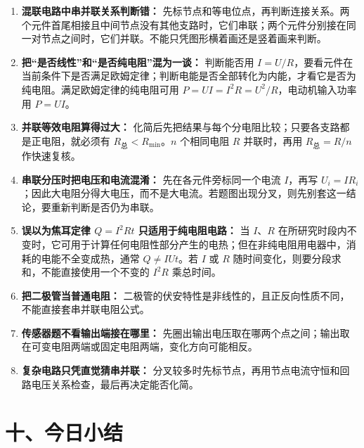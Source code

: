 \begin{mistakebox}
\begin{enumerate}
  \item \textbf{混联电路中串并联关系判断错：} 先标节点和等电位点，再判断连接关系。两个元件首尾相接且中间节点没有其他支路时，它们串联；两个元件分别接在同一对节点之间时，它们并联。不能只凭图形横着画还是竖着画来判断。

  \item \textbf{把“是否线性”和“是否纯电阻”混为一谈：} 判断能否用 $I=U/R$，要看元件在当前条件下是否满足欧姆定律；判断电能是否全部转化为内能，才看它是否为纯电阻。满足欧姆定律的纯电阻可用 $P=UI=I^2R=U^2/R$，电动机输入功率用 $P=UI$。

  \item \textbf{并联等效电阻算得过大：} 化简后先把结果与每个分电阻比较；只要各支路都是正电阻，就必须有 $R_{\text{总}}<R_{\min}$。$n$ 个相同电阻 $R$ 并联时，再用 $R_{\text{总}}=R/n$ 作快速复核。

  \item \textbf{串联分压时把电压和电流混淆：} 先在各元件旁标同一个电流 $I$，再写 $U_i=IR_i$；因此大电阻分得大电压，而不是大电流。若题图出现分叉，则先别套这一结论，要重新判断是否仍为串联。

  \item \textbf{误以为焦耳定律 $Q = I^2Rt$ 只适用于纯电阻电路：} 当 $I$、$R$ 在所研究时段内不变时，它可用于计算任何电阻性部分产生的电热；但在非纯电阻用电器中，消耗的电能不全变成热，通常 $Q \neq IUt$。若 $I$ 或 $R$ 随时间变化，则要分段求和，不能直接使用一个不变的 $I^2R$ 乘总时间。

  \item \textbf{把二极管当普通电阻：} 二极管的伏安特性是非线性的，且正反向性质不同，不能直接套串并联电阻公式。

  \item \textbf{传感器题不看输出端接在哪里：} 先圈出输出电压取在哪两个点之间；输出取在可变电阻两端或固定电阻两端，变化方向可能相反。

  \item \textbf{复杂电路只凭直觉猜串并联：} 分叉较多时先标节点，再用节点电流守恒和回路电压关系检查，最后再决定能否化简。
\end{enumerate}
\end{mistakebox}

\section*{十、今日小结}

